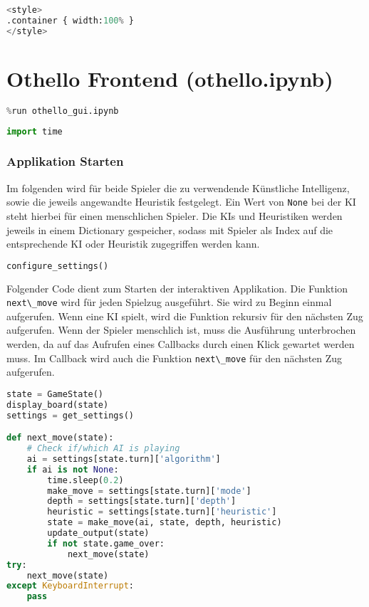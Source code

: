 \begin{lstlisting}[language=Python]
%%HTML
<style>
.container { width:100% }
</style>
\end{lstlisting}

\hypertarget{othello-frontend-othello.ipynb}{%
\section{Othello Frontend
(othello.ipynb)}\label{othello-frontend-othello.ipynb}}

\begin{lstlisting}[language=Python]
%run othello_ai.ipynb
%run othello_gui.ipynb
\end{lstlisting}

\begin{lstlisting}[language=Python]
import time
\end{lstlisting}

\hypertarget{applikation-starten}{%
\subsubsection{Applikation Starten}\label{applikation-starten}}

Im folgenden wird für beide Spieler die zu verwendende Künstliche
Intelligenz, sowie die jeweils angewandte Heuristik festgelegt. Ein Wert
von \passthrough{\lstinline!None!} bei der KI steht hierbei für einen
menschlichen Spieler. Die KIs und Heuristiken werden jeweils in einem
Dictionary gespeicher, sodass mit Spieler als Index auf die
entsprechende KI oder Heuristik zugegriffen werden kann.

\begin{lstlisting}[language=Python]
configure_settings()
\end{lstlisting}

Folgender Code dient zum Starten der interaktiven Applikation. Die
Funktion \passthrough{\lstinline!next\_move!} wird für jeden Spielzug
ausgeführt. Sie wird zu Beginn einmal aufgerufen. Wenn eine KI spielt,
wird die Funktion rekursiv für den nächsten Zug aufgerufen. Wenn der
Spieler menschlich ist, muss die Ausführung unterbrochen werden, da auf
das Aufrufen eines Callbacks durch einen Klick gewartet werden muss. Im
Callback wird auch die Funktion \passthrough{\lstinline!next\_move!} für
den nächsten Zug aufgerufen.

\begin{lstlisting}[language=Python]
state = GameState()
display_board(state)
settings = get_settings()

def next_move(state):
    # Check if/which AI is playing
    ai = settings[state.turn]['algorithm']
    if ai is not None:
        time.sleep(0.2)
        make_move = settings[state.turn]['mode']
        depth = settings[state.turn]['depth']
        heuristic = settings[state.turn]['heuristic']
        state = make_move(ai, state, depth, heuristic)
        update_output(state)
        if not state.game_over:
            next_move(state)
try:
    next_move(state)
except KeyboardInterrupt:
    pass
\end{lstlisting}
